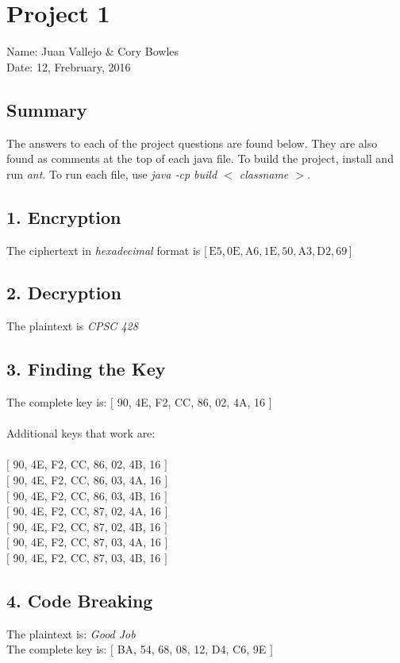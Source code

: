 \documentclass{article}
\begin{document}
\section*{Project 1}
Name: Juan Vallejo \& Cory Bowles
\\Date: 12, Frebruary, 2016

\subsection*{Summary} %
The answers to each of the project questions are found below.
They are also found as comments at the top of each java file.
To build the project, install and run {\it ant}. To run each file,
use {\it java -cp build $<$ classname $>$}.

\subsection*{1. Encryption}

The ciphertext in {\it hexadecimal} format is $\lbrack \, \text{E}5, 0\text{E}, \text{A}6, 1\text{E}, 50, \text{A}3, \text{D}2, 69 \, \rbrack$

\subsection*{2. Decryption}

The plaintext is \textit{CPSC 428}

\subsection*{3. Finding the Key}

The complete key is: $\lbrack$ 90, 4E, F2, CC, 86, 02, 4A, 16 $\rbrack$ \\ \\
Additional keys that work are: \\ \\
$\lbrack$ 90, 4E, F2, CC, 86, 02, 4B, 16 $\rbrack$ \\
$\lbrack$ 90, 4E, F2, CC, 86, 03, 4A, 16 $\rbrack$ \\
$\lbrack$ 90, 4E, F2, CC, 86, 03, 4B, 16 $\rbrack$ \\
$\lbrack$ 90, 4E, F2, CC, 87, 02, 4A, 16 $\rbrack$ \\
$\lbrack$ 90, 4E, F2, CC, 87, 02, 4B, 16 $\rbrack$ \\
$\lbrack$ 90, 4E, F2, CC, 87, 03, 4A, 16 $\rbrack$ \\
$\lbrack$ 90, 4E, F2, CC, 87, 03, 4B, 16 $\rbrack$

\subsection*{4. Code Breaking}

The plaintext is: \textit{Good Job} \\
The complete key is: $\lbrack$ BA, 54, 68, 08, 12, D4, C6, 9E $\rbrack$
\end{document}
